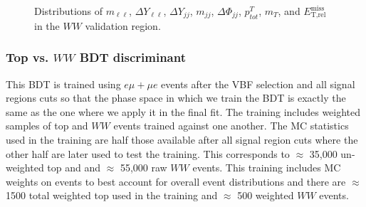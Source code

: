 \begin{figure}[!h]
{  }\hfill
  \hfill
  \hfill
{\caption{Distributions of $m_{\ell\ell}$, $\Delta Y_{\ell\ell}$, $\Delta Y_{jj}$, $m_{jj}$, $\Delta\Phi_{jj}$, $p^T_{tot}$, $m_T$, and $\ensuremath{E_{\text{T,rel}}^{\text{miss}}}$ in the $WW$ validation region.
\label{fig:WWCR3}}}
\end{figure}

\subsubsection{Top vs. $WW$ BDT discriminant}

This BDT is trained using $e\mu+\mu e$ events after the VBF selection and all signal regions cuts so that the phase space in which we train the BDT is exactly the same as the one where we apply it in the final fit. The training includes weighted samples of top and $WW$ events trained against one another. The MC statistics used in the training are half those available after all signal region cuts where the other half are later used to test the training. This corresponds to $\approx$ 35,000 un-weighted top and and $\approx$ 55,000 raw $WW$ events. This training includes MC weights on events to best account for overall event distributions and there are $\approx$ 1500 total weighted top used in the training and $\approx$ 500 weighted $WW$ events. 

